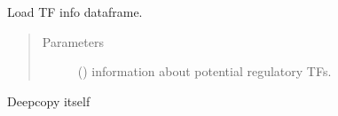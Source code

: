 \documentclass[letterpaper,10pt,english]{sphinxmanual}
\begin{document}
\begin{fulllineitems}
\begin{fulllineitems}
\begin{quote}
\begin{description}
\end{description}\end{quote}

\end{fulllineitems}


\begin{fulllineitems}
\label{\detokenize{modules/celloracle:celloracle.Net.addTFinfo_matrix}}
Load TF info dataframe.
\begin{quote}\begin{description}
\item[{Parameters}] \leavevmode
{} () \textendash{} information about potential regulatory TFs.

\end{description}\end{quote}

\end{fulllineitems}


\begin{fulllineitems}
\label{\detokenize{modules/celloracle:celloracle.Net.copy}}
Deepcopy itself

\end{fulllineitems}



\end{fulllineitems}
\end{document}
